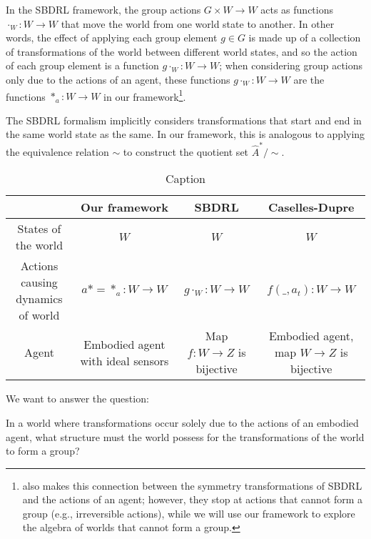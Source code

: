 In the SBDRL framework, the group actions $G \times W \to W$ acts as functions $\cdot_{W}: W \to W$ that move the world from one world state to another.
In other words, the effect of applying each group element $g \in G$ is made up of a collection of transformations of the world between different world states, and so the action of each group element is a function $g \cdot_{W}: W \to W$; when considering group actions only due to the actions of an agent, these functions $g \cdot_{W}: W \to W$ are the functions $*_{a}: W \to W$ in our framework\footnote{\autocite{caselles2019symmetry} also makes this connection between the symmetry transformations of SBDRL and the actions of an agent; however, they stop at actions that cannot form a group (e.g., irreversible actions), while we will use our framework to explore the algebra of worlds that cannot form a group.}.

The SBDRL formalism implicitly considers transformations that
start and end in the same world state as the same.
In our framework, this is analogous to applying the equivalence relation $\sim$ to construct the quotient set $\hat{A}^{*}/\sim$.

\begin{table}[H]
    \centering
    \begin{tabular}{|c|c|c|c|}
                                          & Our framework                     & SBDRL                         & Caselles-Dupre                             \\
        \hline
        States of the world               & $W$                               & $W$                           & $W$                                        \\
        Actions causing dynamics of world & $a* = *_{a}: W \to W$             & $g \cdot_{W}: W \to W$        & $f(\_, a_{t}): W \to W$                    \\
        Agent                             & Embodied agent with ideal sensors & Map $f: W \to Z$ is bijective & Embodied agent, map $W \to Z$ is bijective
    \end{tabular}
    \caption{Caption}
    \label{tab:my_label}
\end{table}

We want to answer the question:
\begin{center}
    In a world where transformations occur solely due to the actions of an embodied agent, what structure must the world possess for the transformations of the world to form a group?
\end{center}


